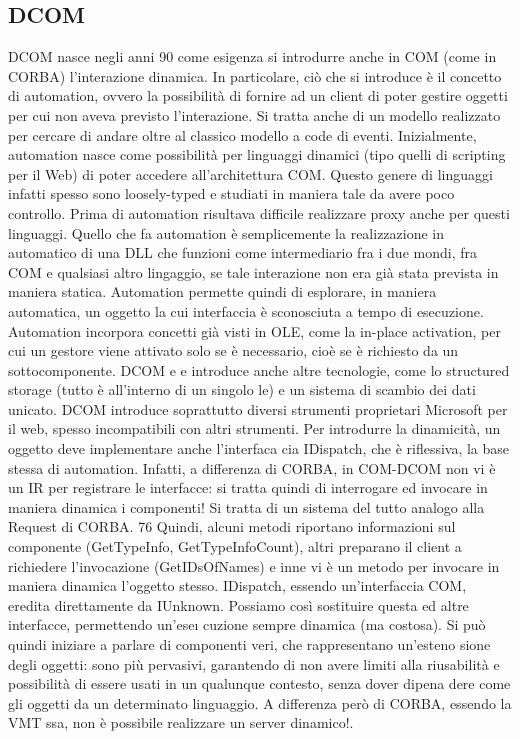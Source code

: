 \subsection{DCOM}
DCOM nasce negli anni 90 come esigenza si introdurre anche in COM (come
in CORBA) l'interazione dinamica. In particolare, ciò che si introduce è il
concetto di automation, ovvero la possibilità di fornire ad un client di poter
gestire oggetti per cui non aveva previsto l'interazione. Si tratta anche di un
modello realizzato per cercare di andare oltre al classico modello a code di eventi.
Inizialmente, automation nasce come possibilità per linguaggi dinamici (tipo
quelli di scripting per il Web) di poter accedere all'architettura COM. Questo
genere di linguaggi infatti spesso sono loosely-typed e studiati in maniera tale
da avere poco controllo. Prima di automation risultava difficile realizzare proxy
anche per questi linguaggi.
Quello che fa automation è semplicemente la realizzazione in automatico di
una DLL che funzioni come intermediario fra i due mondi, fra COM e qualsiasi
altro lingaggio, se tale interazione non era già stata prevista in maniera statica.
Automation permette quindi di esplorare, in maniera automatica, un oggetto
la cui interfaccia è sconosciuta a tempo di esecuzione. Automation incorpora
concetti già visti in OLE, come la in-place activation, per cui un gestore viene
attivato solo se è necessario, cioè se è richiesto da un sottocomponente. DCOM
e e
introduce anche altre tecnologie, come lo structured storage (tutto è all'interno
di un singolo le) e un sistema di scambio dei dati unicato. DCOM introduce
soprattutto diversi strumenti proprietari Microsoft per il web, spesso incompatibili con altri strumenti.
Per introdurre la dinamicità, un oggetto deve implementare anche l'interfaca
cia IDispatch, che è riflessiva, la base stessa di automation. Infatti, a differenza
di CORBA, in COM-DCOM non vi è un IR per registrare le interfacce: si tratta
quindi di interrogare ed invocare in maniera dinamica i componenti! Si tratta
di un sistema del tutto analogo alla Request di CORBA.
76
Quindi, alcuni metodi riportano informazioni sul componente (GetTypeInfo,
GetTypeInfoCount), altri preparano il client a richiedere l'invocazione (GetIDsOfNames) e inne vi è un metodo per
invocare in maniera dinamica l'oggetto
stesso. IDispatch, essendo un'interfaccia COM, eredita direttamente da IUnknown. Possiamo così sostituire questa ed
altre interfacce, permettendo un'ese\i{}
cuzione sempre dinamica (ma costosa).
Si può quindi iniziare a parlare di componenti veri, che rappresentano un'esteno
sione degli oggetti: sono più pervasivi, garantendo di non avere limiti alla riusabilità e possibilità di essere usati
in un qualunque contesto, senza dover dipena
dere come gli oggetti da un determinato linguaggio.
A differenza però di CORBA, essendo la VMT ssa, non è possibile realizzare
un server dinamico!.
